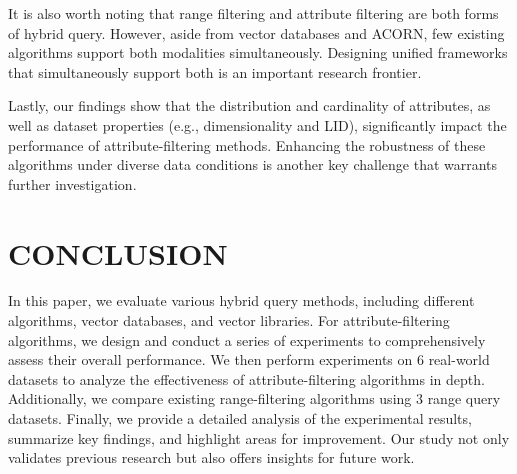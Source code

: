 \documentclass[sigconf, nonacm]{acmart}
\begin{document}
It is also worth noting that range filtering and attribute filtering are both forms of hybrid query. However, aside from vector databases and ACORN, few existing algorithms support both modalities simultaneously. Designing unified frameworks that simultaneously support both is an important research frontier. 

Lastly, our findings show that the distribution and cardinality of attributes, as well as dataset properties (e.g., dimensionality and LID), significantly impact the performance of attribute-filtering methods. Enhancing the robustness of these algorithms under diverse data conditions is another key challenge that warrants further investigation.


\section{CONCLUSION}

In this paper, we evaluate various hybrid query methods, including different algorithms, vector databases, and vector libraries. For attribute-filtering algorithms, we design and conduct a series of experiments to comprehensively assess their overall performance. We then perform experiments on 6 real-world datasets to analyze the effectiveness of attribute-filtering algorithms in depth. Additionally, we compare existing range-filtering algorithms using 3 range query datasets. Finally, we provide a detailed analysis of the experimental results, summarize key findings, and highlight areas for improvement. Our study not only validates previous research but also offers insights for future work.



\clearpage



\end{document}
